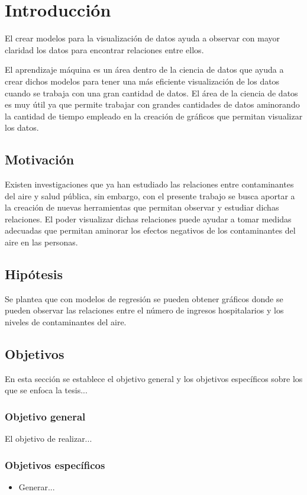 \chapter{Introducción}
El crear modelos para la visualización de datos ayuda a observar con mayor claridad los datos para encontrar relaciones entre ellos.

El aprendizaje máquina es un área dentro de la ciencia de datos que ayuda a crear dichos modelos para tener una más eficiente visualización de los datos cuando se trabaja con una gran cantidad de datos. El área de la ciencia de datos es muy útil ya que permite trabajar con grandes cantidades de datos aminorando la cantidad de tiempo empleado en la creación de gráficos que permitan visualizar los datos.
\clearpage

\section{Motivación}
Existen investigaciones que ya han estudiado las relaciones entre contaminantes del aire y salud pública, sin embargo, con el presente trabajo se busca aportar a la creación de nuevas herramientas que permitan observar y estudiar dichas relaciones. El poder visualizar dichas relaciones puede ayudar a tomar medidas adecuadas que permitan aminorar los efectos negativos de los contaminantes del aire en las personas.

\section{Hipótesis}
Se plantea que con modelos de regresión se pueden obtener gráficos donde se pueden observar las relaciones entre el número de ingresos hospitalarios y los niveles de contaminantes del aire.

\section{Objetivos}
En esta sección se establece el objetivo general y los objetivos específicos sobre los que se enfoca la tesis...

\subsection{Objetivo general}
El objetivo de realizar...

\subsection{Objetivos específicos}
\begin{itemize}
\item Generar...
\end{itemize}


